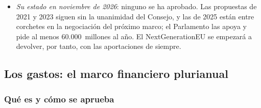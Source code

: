 \documentclass[11pt]{article}
\begin{document}
\begin{itemize}
\begin{itemize}
  \item \emph{el calendario}: tras un periodo transitorio solo de información (octubre de 2023 a diciembre de 2025), el \emph{régimen definitivo} empezó el 1~de enero de 2026; los certificados se venden desde febrero de 2027, y en 2027 se declara y se paga lo importado en 2026. La simplificación de 2025 dejó fuera a los importadores de menos de 50~toneladas al año, 9~de cada 10, pero solo el 1~\% de las emisiones\nocite{CE2026MAFC,UE2025Reglamento2083}.
  \end{itemize}
  Para el presupuesto es un recurso pequeño (unos 1.400~millones al año si se aprueba el 75~\% propuesto), pero muy «europeo»: nace de una política común y recae sobre las importaciones, no sobre las aportaciones de los Estados.
\item \emph{Su estado en noviembre de 2026}: ninguno se ha aprobado. Las propuestas de 2021 y 2023 siguen sin la unanimidad del Consejo, y las de 2025 están entre corchetes en la negociación del próximo marco; el Parlamento las apoya y pide al menos 60.000~millones al año\nocite{TCE2026Dictamen,PE2026InformeIntermedio}. El NextGenerationEU se empezará a devolver, por tanto, con las aportaciones de siempre.
\end{itemize}

\begin{infografia}[H]
\centering
\caption{Cómo funciona el Mecanismo de Ajuste en Frontera por Carbono en su régimen definitivo}\label{figu:mafc}
\end{infografia}

\subsection{Los gastos: el marco financiero plurianual}\label{sec:mfp}

\subsubsection{Qué es y cómo se aprueba}\label{sec:mfp-que}
\end{document}
